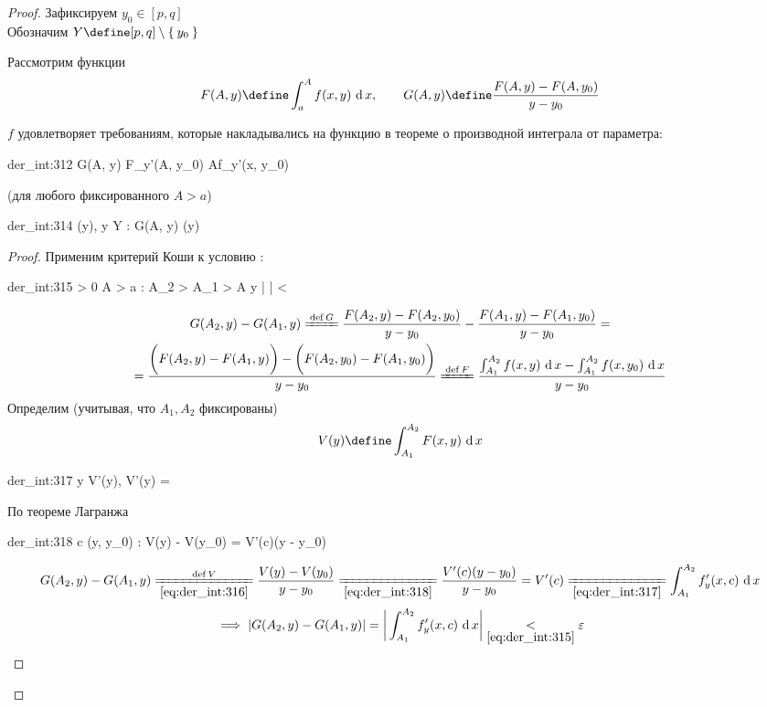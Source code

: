 \begin{proof}
	Зафиксируем $ y_0 \in [p, q] $ \\
	Обозначим $ Y \define [p, q] \setminus \set{y_0} $

	Рассмотрим функции
	$$ F(A, y) \define \dint{a}A{f(x, y)}, \qquad G(A, y) \define \frac{F(A, y) - F(A, y_0)}{y - y_0} $$

	$ f $ удовлетворяет требованиям, которые накладывались на функцию в теореме о производной интеграла от параметра:
	\begin{equ}{der_int:312}
		\exist {} G(A, y) \bydef {}   F_y'(A, y_0)  A{f_y'(x, y_0)}
	\end{equ}
	(для любого фиксированного $ A > a $)

	\begin{statement}
		\begin{equ}{der_int:314}
			\exist \Phi(y), \quad y \in Y : \quad G(A, y)  \Phi(y)
		\end{equ}
	\end{statement}
	\begin{proof}
		Применим критерий Коши к условию :
		\begin{equ}{der_int:315}
			\forall \veps > 0 \quad \exist A > a : \quad \forall A_2 > A_1 > A \quad \forall y \in [p, q] \quad \bigg|  \bigg| < \veps
		\end{equ}
		\begin{multline}\lbl{der_int:316}
			G(A_2, y) - G(A_1, y) \bdefeq{G} \frac{F(A_2, y) - F(A_2, y_0)}{y - y_0} - \frac{F(A_1, y) - F(A_1, y_0)}{y - y_0} = \\
			= \frac{\bigg( F(A_2, y) - F(A_1, y) \bigg) - \bigg( F(A_2, y_0) - F(A_1, y_0) \bigg)}{y - y_0} \bdefeq{F} \frac{\dint{A_1}{A_2}{f(x, y)} - \dint{A_1}{A_2}{f(x, y_0)}}{y - y_0}
		\end{multline}
		Определим (учитывая, что $ A_1, A_2 $ фиксированы)
		$$ V(y) \define \dint{A_1}{A_2}{F(x, y)} $$
		\begin{equ}{der_int:317}
			\forall y \in [p, q] \quad \exist V'(y), \qquad V'(y) = 
		\end{equ}
		По теореме Лагранжа
		\begin{equ}{der_int:318}
			\exist c \in (y, \between y_0) : \quad V(y) - V(y_0) = V'(c)(y - y_0)
		\end{equ}
		$$ G(A_2, y) - G(A_1, y) \xlongequal[\eref{der_int:316}]{\operatorname{def} V} \frac{V(y) - V(y_0)}{y - y_0} \undereq{\eref{der_int:318}} \frac{V'(c)(y - y_0)}{y - y_0} = V'(c) \undereq{\eref{der_int:317}} \dint{A_1}{A_2}{f_y'(x, c)} $$
		$$ \implies |G(A_2, y) - G(A_1, y)| = \bigg| \dint{A_1}{A_2}{f_y'(x, c)} \bigg| \underset{\eref{der_int:315}}< \veps $$
	\end{proof}


\end{proof}
